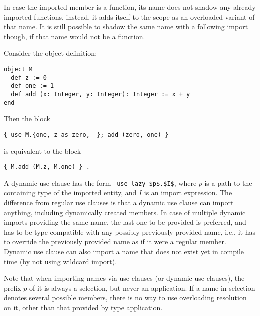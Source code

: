 In case the imported member is a function, its name does not shadow any already imported functions, instead, it adds itself to the scope as an overloaded variant of that name. It is still possible to shadow the same name with a following import though, if that name would not be a function. 

\example Consider the object definition:
\begin{lstlisting}
object M
  def z := 0
  def one := 1
  def add (x: Integer, y: Integer): Integer := x + y
end
\end{lstlisting}
Then the block
\begin{lstlisting}
{ use M.{one, z as zero, _}; add (zero, one) }
\end{lstlisting}
is equivalent to the block
\begin{lstlisting}
{ M.add (M.z, M.one) } .
\end{lstlisting}

A dynamic use clause has the form ~\lstinline!use lazy $p$.$I$!, where $p$ is a path to the containing type of the imported entity, and $I$ is an import expression. The difference from regular use clauses is that a dynamic use clause can import anything, including dynamically created members. In case of multiple dynamic imports providing the same name, the last one to be provided is preferred, and has to be type-compatible with any possibly previously provided name, i.e., it has to override the previously provided name as if it were a regular member. Dynamic use clause can also import a name that does not exist yet in compile time (by not using wildcard import). 

Note that when importing names via use clauses (or dynamic use clauses), the prefix $p$ of it is always a selection, but never an application. If a name in selection denotes several possible members, there is no way to use overloading resolution on it, other than that provided by type application. 





